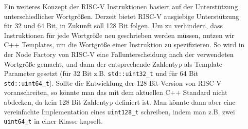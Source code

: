 Ein weiteres Konzept der RISC-V Instruktionen basiert auf der Unterstützung
unterschiedlicher Wortgrößen. Derzeit bietet RISC-V ausgiebige Unterstützung für
32 und 64 Bit, in Zukunft soll 128 Bit folgen. Um zu verhindern, dass
Instruktionen für jede Wortgröße neu geschrieben werden müssen, nutzen wir C++
Templates, um die Wortgröße einer Instruktion zu spezifizieren. So wird in der
Node Factory von RISC-V eine Fallunterscheidung nach der verwendeten Wortgröße
gemacht, und dann der entsprechende Zahlentyp als Template Parameter gesetzt
(für 32 Bit z.B. \texttt{std::uint32\_t} und für 64 Bit
\texttt{std::uint64\_t}). Sollte die Entwicklung der 128 Bit Version von RISC-V
voranschreiten, so könnte man das mit dem aktuellen C++ Standard nicht abdecken,
da kein 128 Bit Zahlentyp definiert ist. Man könnte dann aber eine vereinfachte
Implementation eines \texttt{uint128\_t} schreiben, indem man z.B. zwei
\texttt{uint64\_t} in einer Klasse kapselt.
